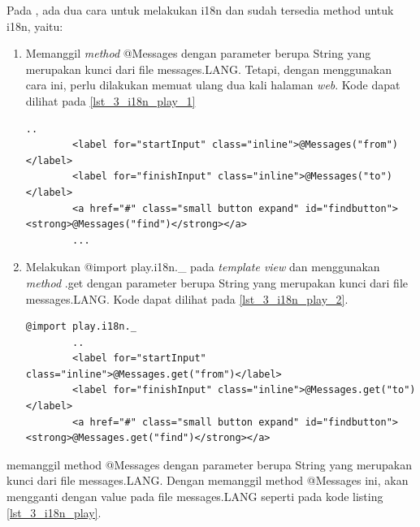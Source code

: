 Pada \play, ada dua cara untuk melakukan i18n dan sudah tersedia method untuk i18n, yaitu:
\begin{enumerate}
	\item Memanggil \textit{method} @Messages dengan parameter berupa String yang merupakan kunci dari file messages.LANG. Tetapi, dengan menggunakan cara ini, perlu dilakukan memuat ulang dua kali halaman \textit{web}. Kode dapat dilihat pada \ref{lst_3_i18n_play_1}
	
	\begin{lstlisting}[caption=Script \play untuk Internationalization,label = {lst_3_i18n_play_1}]
		..
		<label for="startInput" class="inline">@Messages("from")</label>
		<label for="finishInput" class="inline">@Messages("to")</label>
		<a href="#" class="small button expand" id="findbutton"><strong>@Messages("find")</strong></a>
		...
	\end{lstlisting}
	
	
	\item Melakukan @import play.i18n.\_ pada \textit{template view} dan menggunakan \textit{method} \@Messages.get dengan parameter berupa String yang merupakan kunci dari file messages.LANG. Kode dapat dilihat pada \ref{lst_3_i18n_play_2}.
	
		\begin{lstlisting}[caption=Script \play untuk Internationalization,label = {lst_3_i18n_play_2}]
		@import play.i18n._
		..
		<label for="startInput" class="inline">@Messages.get("from")</label>
		<label for="finishInput" class="inline">@Messages.get("to")</label>
		<a href="#" class="small button expand" id="findbutton"><strong>@Messages.get("find")</strong></a>
	\end{lstlisting}
	
\end{enumerate}
 memanggil method @Messages dengan parameter berupa String yang merupakan kunci dari file messages.LANG. Dengan memanggil method @Messages ini, akan mengganti dengan value pada file messages.LANG seperti pada kode listing \ref{lst_3_i18n_play}.

